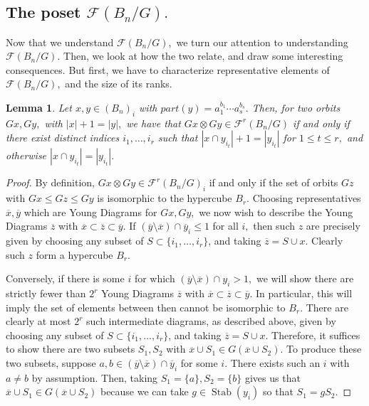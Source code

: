 \documentclass{amsart}
\newtheorem{lem}[thm]{Lemma}
\theoremstyle{remark}
\newcommand\ssec{\subsection}
\def\Stab{\operatorname{Stab}}
\begin{document}
\iffalse

\ssec{The poset $\mathcal F(B_n/G).$} Now that we understand $\mathcal F(B_n/G),$ we turn our attention to understanding $\mathcal F(B_n/G).$ Then, we look at how the two relate, and draw some interesting consequences. But first, we have to characterize representative elements of $\mathcal F(B_n/G),$ and the size of its ranks.

\begin{lem}
\label{lem:pairs_in_edge_poset}
Let $x,y \in (B_n)_i$ with $part(y)= a_1^{b_1}\cdots a_s^{b_s}.$ Then, for two orbits $Gx,Gy,$ with $|x|+1=|y|,$ we have that $Gx \otimes Gy \in \mathcal F^r(B_n/G)$ if and only if there exist distinct indices $i_1,\ldots, i_r$ such that $|x\cap y_{i_t}|+1 = |y_{i_t}|$ for $1 \leq t \leq r,$ and otherwise  $|x\cap y_{i_t}|= |y_{i_t}|.$
\end{lem}
\begin{proof}
By definition, $Gx\otimes Gy\in \mathcal F^r(B_n/G)_i$ if and only if the set of orbits $Gz$ with $Gx \leq Gz \leq Gy$ is isomorphic to the hypercube $B_r.$ Choosing representatives $\overline{x},\overline{y}$ which are Young Diagrams for $Gx,Gy,$ we now wish to describe the Young Diagrams $\overline{z}$ with $\overline{x} \subset \overline{z} \subset \overline{y}.$ If $(\overline{y}\setminus \overline{x}) \cap \overline{y}_i \leq 1$ for all $i,$ then such $z$ are precisely given by choosing any subset of $S \subset \{i_1,\ldots, i_r\}$, and taking $\overline{z} = S \cup x.$ Clearly such $z$ form a hypercube $B_r.$

Conversely, if there is some $i$ for which $(\overline{y}\setminus \overline{x}) \cap y_i > 1,$ we will show there are strictly fewer than $2^r$ Young Diagrams $\overline{z}$ with $\overline{x}\subset \overline{z} \subset \overline{y}.$ In particular, this will imply the set of elements between then cannot be isomorphic to $B_r.$ There are clearly at most $2^r$ such intermediate diagrams, as described above, given by choosing any subset of $S \subset \{i_1,\ldots, i_r\}$, and taking $\overline{z} = S \cup x.$ Therefore, it suffices to show there are two subsets $S_1,S_2$ with $\overline{x}\cup S_1 \in G(\overline{x}\cup S_2).$ To produce these two subsets, suppose $a,b \in (\overline{y}\setminus \overline{x}) \cap \overline{y}_i$ for some $i$. There exists such an $i$ with $a \neq b$ by assumption. Then, taking $S_1 = \{a\},S_2=\{b\}$ gives us that $\overline{x}\cup S_1 \in G(\overline{x}\cup S_2)$ because we can take $g \in \Stab(y_i)$ so that $S_1 = gS_2.$
\end{proof}
\end{document}
